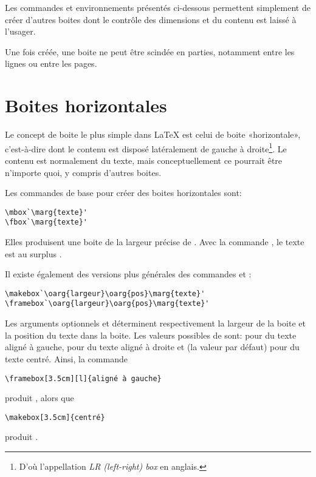 Les commandes et environnements présentés ci-dessous permettent
simplement de créer d'autres boites dont le contrôle des dimensions et
du contenu est laissé à l'usager.

Une fois créée, une boite ne peut être scindée en parties, notamment
entre les lignes ou entre les pages.


\section{Boites horizontales}
\label{sec:boites:lrbox}

Le concept de boite le plus simple dans {\LaTeX} est celui de boite
«horizontale», c'est-à-dire dont le contenu est disposé latéralement
de gauche à droite\footnote{%
  D'où l'appellation \emph{LR (left-right) box} en anglais.}. %
Le contenu est normalement du texte, mais conceptuellement ce pourrait
être n'importe quoi, y compris d'autres boites.

Les commandes de base pour créer des boites horizontales sont:
\begin{lstlisting}
\mbox`\marg{texte}'
\fbox`\marg{texte}'
\end{lstlisting}
Elles produisent une boite de la largeur précise de . Avec
la commande \cmd{\fbox}, le texte est au surplus .

Il existe également des versions plus générales des commandes
\cmd{\mbox} et \cmd{\fbox}:
\begin{lstlisting}
\makebox`\oarg{largeur}\oarg{pos}\marg{texte}'
\framebox`\oarg{largeur}\oarg{pos}\marg{texte}'
\end{lstlisting}
Les arguments optionnels  et  déterminent
respectivement la largeur de la boite et la position du texte
dans la boite. Les valeurs possibles de  sont:  pour
du texte aligné à gauche,  pour du texte aligné à droite et
 (la valeur par défaut) pour du texte centré. Ainsi, la commande
\begin{lstlisting}
\framebox[3.5cm][l]{aligné à gauche}
\end{lstlisting}
produit , alors que
\begin{lstlisting}
\makebox[3.5cm]{centré}
\end{lstlisting}
produit .


